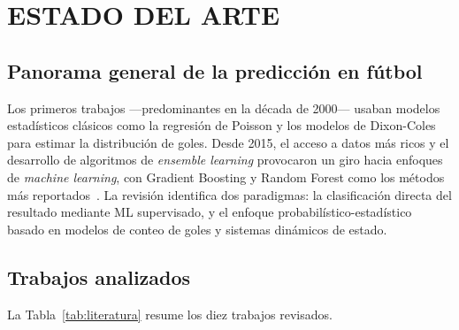 \documentclass[12pt,letterpaper,oneside]{report}
\begin{document}
\chapter{ESTADO DEL ARTE}
\label{sec:estado}

\section{Panorama general de la predicción en fútbol}
Los primeros trabajos ---predominantes en la década de 2000--- usaban modelos estadísticos clásicos como la regresión de Poisson y los modelos de Dixon-Coles para estimar la distribución de goles. Desde 2015, el acceso a datos más ricos y el desarrollo de algoritmos de \textit{ensemble learning} provocaron un giro hacia enfoques de \textit{machine learning}, con Gradient Boosting y Random Forest como los métodos más reportados~\cite{ricogonzalez2023ml}. La revisión identifica dos paradigmas: la clasificación directa del resultado mediante ML supervisado, y el enfoque probabilístico-estadístico basado en modelos de conteo de goles y sistemas dinámicos de estado.

\section{Trabajos analizados}
La Tabla~\ref{tab:literatura} resume los diez trabajos revisados.
\end{document}
